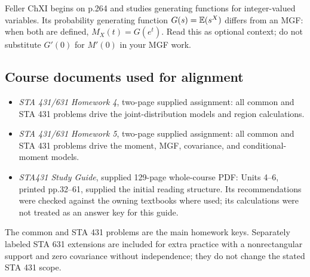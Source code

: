 Feller ChXI begins on p.264 and studies generating functions for integer-valued variables. Its probability generating function $G(s)=\mathbb E(s^X)$ differs from an MGF: when both are defined, $M_X(t)=G(e^t)$. Read this as optional context; do not substitute $G'(0)$ for $M'(0)$ in your MGF work.

\subsection{Course documents used for alignment}
\begin{itemize}
\item \emph{STA 431/631 Homework 4}, two-page supplied assignment: all common and STA 431 problems drive the joint-distribution models and region calculations.
\item \emph{STA 431/631 Homework 5}, two-page supplied assignment: all common and STA 431 problems drive the moment, MGF, covariance, and conditional-moment models.
\item \emph{STA431 Study Guide}, supplied 129-page whole-course PDF: Units 4--6, printed pp.32--61, supplied the initial reading structure. Its recommendations were checked against the owning textbooks where used; its calculations were not treated as an answer key for this guide.
\end{itemize}
The common and STA 431 problems are the main homework keys. Separately labeled STA 631 extensions are included for extra practice with a nonrectangular support and zero covariance without independence; they do not change the stated STA 431 scope.
